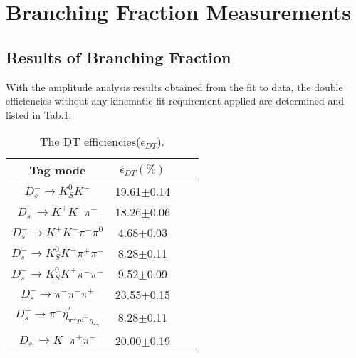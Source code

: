 \section{Branching Fraction Measurements}

\par{
    \subsection{Results of Branching Fraction}
    With the amplitude analysis results obtained from the fit to data, the double efficiencies without any kinematic fit requirement applied are determined and listed in Tab.\ref{DT-eff}.

    \begin{table}
        \caption{ The DT efficiencies($\epsilon_{DT}$).}
        \label{DT-eff}
        \begin{center}
            \begin{tabular}{cccc}
                \toprule
                Tag mode   & $\epsilon_{DT}(\%)$\\
                \hline
                $D_{s}^{-} \rightarrow K_{S}^{0}K^{-}$                                                   & 19.61$\pm$0.14\\
                $D_{s}^{-} \rightarrow K^{+}K^{-}\pi^{-}$                                                & 18.26$\pm$0.06\\
                $D_{s}^{-} \rightarrow K^{+}K^{-}\pi^{-}\pi^{0}$                                         &  4.68$\pm$0.03\\
                $D_{s}^{-} \rightarrow K_{S}^{0}K^{-}\pi^{+}\pi^{-}$                                     &  8.28$\pm$0.11\\
                $D_{s}^{-} \rightarrow K_{S}^{0}K^{+}\pi^{-}\pi^{-}$                                     &  9.52$\pm$0.09\\
                $D_{s}^{-} \rightarrow \pi^{-}\pi^{-}\pi^{+}$                                            & 23.55$\pm$0.15\\
                $D_{s}^{-} \rightarrow \pi^{-}\eta_{\pi^{+}pi^{-}\eta_{\gamma\gamma}}^{'}$               &  8.28$\pm$0.11\\
                $D_{s}^{-} \rightarrow K^{-}\pi^{+}\pi^{-}$                                              & 20.00$\pm$0.19\\
                \bottomrule
            \end{tabular}
        \end{center}
    \end{table}

}
